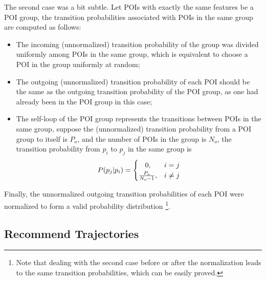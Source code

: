 The second case was a bit subtle.
Let POIs with exactly the same features be a POI group,
the transition probabilities associated with POIs in the same group are computed as follows:
\begin{itemize}
\item The incoming (unnormalized) transition probability of the group was divided uniformly among POIs
      in the same group, which is equivalent to choose a POI in the group uniformly at random;
\item The outgoing (unnormalized) transition probability of each POI should be the same as the
      outgoing transition probability of the POI group, as one had already been in the POI group in this case;
\item The self-loop of the POI group represents the transitions between POIs in the same group,
      suppose the (unnormalized) transition probability from a POI group to itself is $P_o$,
      and the number of POIs in the group is $N_o$,
      the transition probability from $p_i$ to $p_j$ in the same group is
      \begin{displaymath}
          P(p_j | p_i) =
          \begin{cases}
              \hfill 0, \hfill & i = j \\
              \hfill \frac{P_o}{N_o - 1}, \hfill & i \ne j \\
          \end{cases}
      \end{displaymath}
\end{itemize}
Finally, the unnormalized outgoing transition probabilities of each POI were normalized to form
a valid probability distribution
\footnote{Note that dealing with the second case before or after the normalization leads to
the same transition probabilities, which can be easily proved.}.


\subsection{Recommend Trajectories}
\label{method:recommend}

